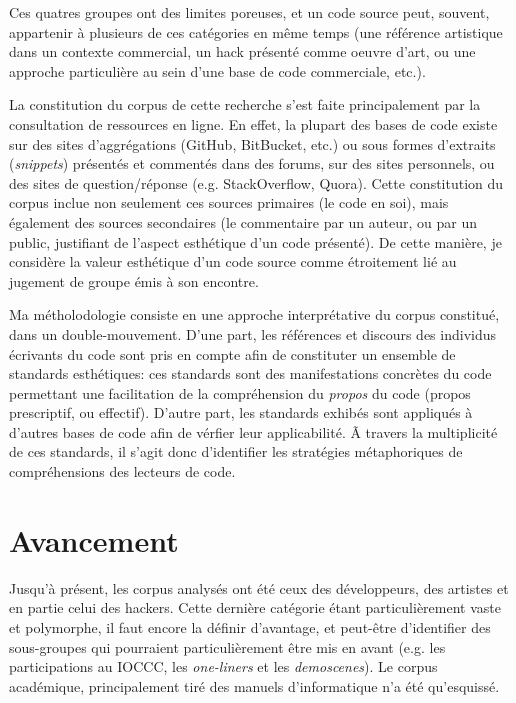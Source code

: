 \documentclass{article}
\begin{document}
Ces quatres groupes ont des limites poreuses, et un code source peut, souvent, appartenir à plusieurs de ces catégories en même temps (une référence artistique dans un contexte commercial, un hack présenté comme oeuvre d'art, ou une approche particulière au sein d'une base de code commerciale, etc.).

La constitution du corpus de cette recherche s'est faite principalement par la consultation de ressources en ligne. En effet, la plupart des bases de code existe sur des sites d'aggrégations (GitHub, BitBucket, etc.) ou sous formes d'extraits (\emph{snippets}) présentés et commentés dans des forums, sur des sites personnels, ou des sites de question/réponse (e.g. StackOverflow, Quora). Cette constitution du corpus inclue non seulement ces sources primaires (le code en soi), mais également des sources secondaires (le commentaire par un auteur, ou par un public, justifiant de l'aspect esthétique d'un code présenté). De cette manière, je considère la valeur esthétique d'un code source comme étroitement lié au jugement de groupe émis à son encontre.

Ma métholodologie consiste en une approche interprétative du corpus constitué, dans un double-mouvement. D'une part, les références et discours des individus écrivants du code sont pris en compte afin de constituter un ensemble de standards esthétiques: ces standards sont des manifestations concrètes du code permettant une facilitation de la compréhension du \emph{propos} du code (propos prescriptif, ou effectif). D'autre part, les standards exhibés sont appliqués à d'autres bases de code afin de vérfier leur applicabilité. Ã travers la multiplicité de ces standards, il s'agit donc d'identifier les stratégies métaphoriques de compréhensions des lecteurs de code.

\section{Avancement}

Jusqu'à présent, les corpus analysés ont été ceux des développeurs, des artistes et en partie celui des hackers. Cette dernière catégorie étant particulièrement vaste et polymorphe, il faut encore la définir d'avantage, et peut-être d'identifier des sous-groupes qui pourraient particulièrement être mis en avant (e.g. les participations au IOCCC, les \emph{one-liners} et les \emph{demoscenes}). Le corpus académique, principalement tiré des manuels d'informatique n'a été qu'esquissé.
\end{document}
